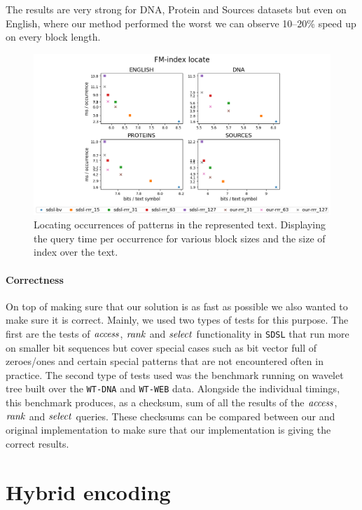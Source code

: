 The results are very strong for DNA, Protein and Sources datasets but even on English, where
our method performed the worst we can observe 10--20\% speed up on every block length.

\begin{figure}
	\centerline{
		\includegraphics[width=\textwidth, height=0.4\textheight]{images/vysledky_sdsl_locate}
	}
	\caption[TODO]{Locating occurrences of patterns in the represented text. Displaying
	the query time per occurrence for various block sizes and the size of index over the
	text.
	}
	\label{obr:benchmark_sdsl_locate}
\end{figure}

\paragraph{Correctness}

On top of making sure that our solution is as fast as possible we also wanted to make sure it is
correct. Mainly, we used two types of tests for this purpose. The first are the tests of $\mathit{access}$,
$\mathit{rank}$ and $\mathit{select}$ functionality in \texttt{SDSL} that run more on smaller bit sequences
but cover special cases such as bit vector full of zeroes/ones and certain special patterns
that are not encountered often in practice. The second type of tests used was the benchmark
running on wavelet tree built over the \texttt{WT-DNA} and \texttt{WT-WEB} data. Alongside
the individual timings, this benchmark produces, as a checksum, sum of all the results of the
$\mathit{access}$, $\mathit{rank}$ and $\mathit{select}$ queries. These checksums can be compared between our and original
implementation to make sure that our implementation is giving the correct results.

\section{Hybrid encoding}


